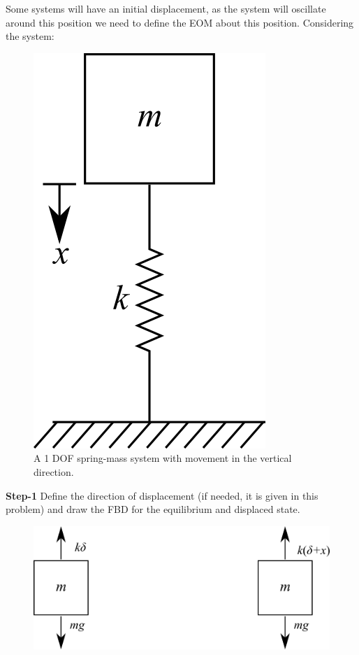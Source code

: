 \documentclass[12pt,letter]{article}
\begin{document}
\begin{example}
			\noindent Some systems will have an initial displacement, as the system will oscillate around this position we need to define the EOM about this position. Considering the system:
			\begin{figure}[H]
				\centering
				\includegraphics[]{../figures/1-DOF-spring_mass_vertical.png}
				\caption{A 1 DOF spring-mass system with movement in the vertical direction.}
			\end{figure}		
			\noindent \textbf{Step-1}
			Define the direction of displacement (if needed, it is given in this problem) and draw the FBD for the equilibrium and displaced state.  
			\begin{figure}[H]
				\centering
				\includegraphics[]{../figures/1-DOF-spring_mass_vertical_FBD.png}\\

\end{figure}
\end{example}
\end{document}
